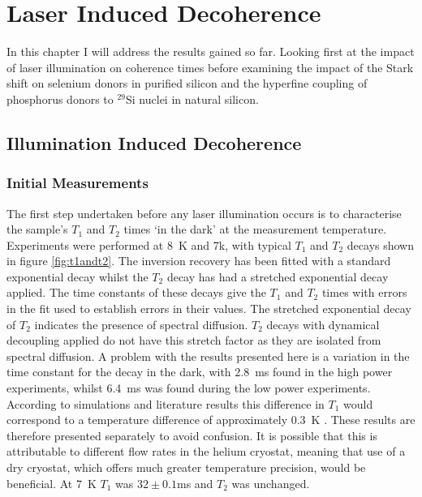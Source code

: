 \chapter{Laser Induced Decoherence}

In this chapter I will address the results gained so far. Looking first at the impact of laser illumination on coherence times before examining the impact of the Stark shift on selenium donors in purified silicon and the hyperfine coupling of phosphorus donors to $^{29}$Si nuclei in natural silicon.

\section{Illumination Induced Decoherence}

\subsection{Initial Measurements}

The first step undertaken before any laser illumination occurs is to characterise the sample's $T_1$ and $T_2$ times `in the dark' at the measurement temperature.
Experiments were performed at 8~K and 7k, with typical $T_1$ and $T_2$ decays shown in figure \ref{fig:t1andt2}.
The inversion recovery has been fitted with a standard exponential decay whilst the $T_2$ decay has had a stretched exponential decay applied.
The time constants of these decays give the $T_1$ and $T_2$ times with errors in the fit used to establish errors in their values.
The stretched exponential decay of $T_2$ indicates the presence of spectral diffusion.
$T_2$ decays with dynamical decoupling applied do not have this stretch factor as they are isolated from spectral diffusion.
A problem with the results presented here is a variation in the time constant for the decay in the dark, with 2.8~ms found in the high power experiments, whilst 6.4~ms was found during the low power experiments.
According to simulations and literature results this difference in $T_1$ would correspond to a temperature difference of approximately 0.3~K \cite{Tyryshkin2012}.
These results are therefore presented separately to avoid confusion.
It is possible that this is attributable to different flow rates in the helium cryostat, meaning that use of a dry cryostat, which offers much greater temperature precision, would be beneficial.
At 7~K $T_1$ was $32\pm0.1$ms and $T_2$ was unchanged.


